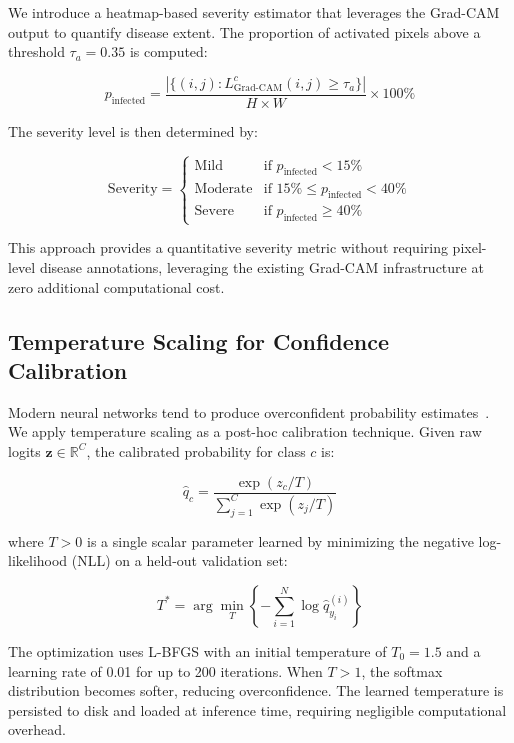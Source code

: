 \documentclass[conference]{IEEEtran}
\begin{document}
We introduce a heatmap-based severity estimator that leverages the Grad-CAM output to quantify disease extent. The proportion of activated pixels above a threshold $\tau_a = 0.35$ is computed:

\begin{equation}
    p_{\text{infected}} = \frac{|\{(i,j) : L_{\text{Grad-CAM}}^c(i,j) \geq \tau_a\}|}{H \times W} \times 100\%
\end{equation}

The severity level is then determined by:

\begin{equation}
    \text{Severity} = 
    \begin{cases}
        \text{Mild} & \text{if } p_{\text{infected}} < 15\% \\
        \text{Moderate} & \text{if } 15\% \leq p_{\text{infected}} < 40\% \\
        \text{Severe} & \text{if } p_{\text{infected}} \geq 40\%
    \end{cases}
\end{equation}

This approach provides a quantitative severity metric without requiring pixel-level disease annotations, leveraging the existing Grad-CAM infrastructure at zero additional computational cost.

\subsection{Temperature Scaling for Confidence Calibration}

Modern neural networks tend to produce overconfident probability estimates~\cite{guo2017calibration}. We apply temperature scaling as a post-hoc calibration technique. Given raw logits $\mathbf{z} \in \mathbb{R}^C$, the calibrated probability for class $c$ is:

\begin{equation}
    \hat{q}_c = \frac{\exp(z_c / T)}{\sum_{j=1}^{C} \exp(z_j / T)}
\end{equation}

\noindent where $T > 0$ is a single scalar parameter learned by minimizing the negative log-likelihood (NLL) on a held-out validation set:

\begin{equation}
    T^* = \arg\min_T \left\{ -\sum_{i=1}^{N} \log \hat{q}_{y_i}^{(i)} \right\}
\end{equation}

The optimization uses L-BFGS with an initial temperature of $T_0 = 1.5$ and a learning rate of 0.01 for up to 200 iterations. When $T > 1$, the softmax distribution becomes softer, reducing overconfidence. The learned temperature is persisted to disk and loaded at inference time, requiring negligible computational overhead.
\end{document}
